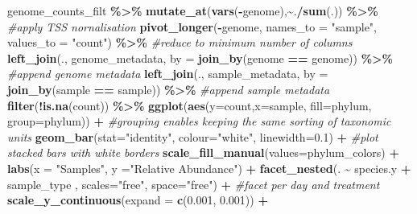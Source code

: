 \documentclass[
]{book}
\newenvironment{Shaded}{\begin{snugshade}}{\end{snugshade}}
\newcommand{\AttributeTok}[1]{\textcolor[rgb]{0.13,0.29,0.53}{#1}}
\newcommand{\CommentTok}[1]{\textcolor[rgb]{0.56,0.35,0.01}{\textit{#1}}}
\newcommand{\FloatTok}[1]{\textcolor[rgb]{0.00,0.00,0.81}{#1}}
\newcommand{\FunctionTok}[1]{\textcolor[rgb]{0.13,0.29,0.53}{\textbf{#1}}}
\newcommand{\NormalTok}[1]{#1}
\newcommand{\SpecialCharTok}[1]{\textcolor[rgb]{0.81,0.36,0.00}{\textbf{#1}}}
\newcommand{\StringTok}[1]{\textcolor[rgb]{0.31,0.60,0.02}{#1}}
\begin{document}
\begin{Shaded}
\begin{Highlighting}[]
\NormalTok{genome\_counts\_filt }\SpecialCharTok{\%\textgreater{}\%}
  \FunctionTok{mutate\_at}\NormalTok{(}\FunctionTok{vars}\NormalTok{(}\SpecialCharTok{{-}}\NormalTok{genome),}\SpecialCharTok{\textasciitilde{}}\NormalTok{.}\SpecialCharTok{/}\FunctionTok{sum}\NormalTok{(.)) }\SpecialCharTok{\%\textgreater{}\%} \CommentTok{\#apply TSS nornalisation}
  \FunctionTok{pivot\_longer}\NormalTok{(}\SpecialCharTok{{-}}\NormalTok{genome, }\AttributeTok{names\_to =} \StringTok{"sample"}\NormalTok{, }\AttributeTok{values\_to =} \StringTok{"count"}\NormalTok{) }\SpecialCharTok{\%\textgreater{}\%} \CommentTok{\#reduce to minimum number of columns}
  \FunctionTok{left\_join}\NormalTok{(., genome\_metadata, }\AttributeTok{by =} \FunctionTok{join\_by}\NormalTok{(genome }\SpecialCharTok{==}\NormalTok{ genome)) }\SpecialCharTok{\%\textgreater{}\%} \CommentTok{\#append genome metadata}
  \FunctionTok{left\_join}\NormalTok{(., sample\_metadata, }\AttributeTok{by =} \FunctionTok{join\_by}\NormalTok{(sample }\SpecialCharTok{==}\NormalTok{ sample)) }\SpecialCharTok{\%\textgreater{}\%} \CommentTok{\#append sample metadata}
  \FunctionTok{filter}\NormalTok{(}\SpecialCharTok{!}\FunctionTok{is.na}\NormalTok{(count)) }\SpecialCharTok{\%\textgreater{}\%}
  \FunctionTok{ggplot}\NormalTok{(}\FunctionTok{aes}\NormalTok{(}\AttributeTok{y=}\NormalTok{count,}\AttributeTok{x=}\NormalTok{sample, }\AttributeTok{fill=}\NormalTok{phylum, }\AttributeTok{group=}\NormalTok{phylum)) }\SpecialCharTok{+} \CommentTok{\#grouping enables keeping the same sorting of taxonomic units}
    \FunctionTok{geom\_bar}\NormalTok{(}\AttributeTok{stat=}\StringTok{"identity"}\NormalTok{, }\AttributeTok{colour=}\StringTok{"white"}\NormalTok{, }\AttributeTok{linewidth=}\FloatTok{0.1}\NormalTok{) }\SpecialCharTok{+} \CommentTok{\#plot stacked bars with white borders}
    \FunctionTok{scale\_fill\_manual}\NormalTok{(}\AttributeTok{values=}\NormalTok{phylum\_colors) }\SpecialCharTok{+}
    \FunctionTok{labs}\NormalTok{(}\AttributeTok{x =} \StringTok{"Samples"}\NormalTok{, }\AttributeTok{y =}\StringTok{"Relative Abundance"}\NormalTok{) }\SpecialCharTok{+}
    \FunctionTok{facet\_nested}\NormalTok{(. }\SpecialCharTok{\textasciitilde{}}\NormalTok{ species.y }\SpecialCharTok{+}\NormalTok{ sample\_type ,  }\AttributeTok{scales=}\StringTok{"free"}\NormalTok{, }\AttributeTok{space=}\StringTok{"free"}\NormalTok{) }\SpecialCharTok{+} \CommentTok{\#facet per day and treatment}
    \FunctionTok{scale\_y\_continuous}\NormalTok{(}\AttributeTok{expand =} \FunctionTok{c}\NormalTok{(}\FloatTok{0.001}\NormalTok{, }\FloatTok{0.001}\NormalTok{)) }\SpecialCharTok{+}

\end{Highlighting}
\end{Shaded}
\end{document}
